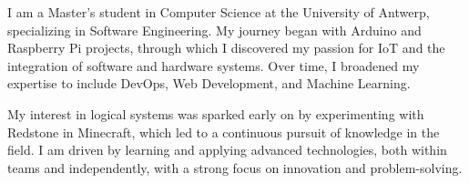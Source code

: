 
\begin{cvparagraph}

I am a Master's student in Computer Science at the University of Antwerp, specializing in Software Engineering.  
My journey began with Arduino and Raspberry Pi projects, through which I discovered my passion for IoT and the integration of software and hardware systems.  
Over time, I broadened my expertise to include DevOps, Web Development, and Machine Learning.

My interest in logical systems was sparked early on by experimenting with Redstone in Minecraft, which led to a continuous pursuit of knowledge in the field.  
I am driven by learning and applying advanced technologies, both within teams and independently, with a strong focus on innovation and problem-solving.
\end{cvparagraph}
